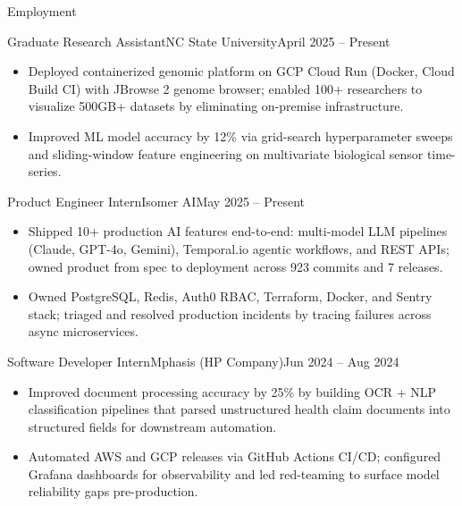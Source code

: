\documentclass[]{mcdowellcv}
\begin{document}
\makeheader

\begin{cvsection}{Employment}
  \begin{cvsubsection}{Graduate Research Assistant}{NC State University}{April 2025 -- Present}
    \begin{itemize}
      \item Deployed containerized genomic platform on GCP Cloud Run (Docker, Cloud Build CI) with JBrowse 2 genome browser; enabled 100+ researchers to visualize 500GB+ datasets by eliminating on-premise infrastructure.
      \item Improved ML model accuracy by 12\% via grid-search hyperparameter sweeps and sliding-window feature engineering on multivariate biological sensor time-series.
    \end{itemize}
    \vspace{-1.5pt}
  \end{cvsubsection}

  \begin{cvsubsection}{Product Engineer Intern}{Isomer AI}{May 2025 -- Present}
    \begin{itemize}
      \item Shipped 10+ production AI features end-to-end: multi-model LLM pipelines (Claude, GPT-4o, Gemini), Temporal.io agentic workflows, and REST APIs; owned product from spec to deployment across 923 commits and 7 releases.
      \item Owned PostgreSQL, Redis, Auth0 RBAC, Terraform, Docker, and Sentry stack; triaged and resolved production incidents by tracing failures across async microservices.
    \end{itemize}
    \vspace{-1.5pt}
  \end{cvsubsection}

  \begin{cvsubsection}{Software Developer Intern}{Mphasis (HP Company)}{Jun 2024 -- Aug 2024}
    \begin{itemize}
      \item Improved document processing accuracy by 25\% by building OCR + NLP classification pipelines that parsed unstructured health claim documents into structured fields for downstream automation.
      \item Automated AWS and GCP releases via GitHub Actions CI/CD; configured Grafana dashboards for observability and led red-teaming to surface model reliability gaps pre-production.
    \end{itemize}
    \vspace{-1.5pt}
  \end{cvsubsection}


\end{cvsection}
\end{document}
